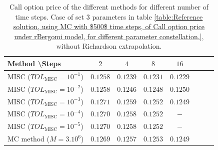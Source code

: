 \begin{table}[h!]
	\centering
	\begin{tabular}{l*{6}{c}r}
		Method \textbackslash  Steps            & $2$ & $4$ & $8$ & $16$ &   \\
		\hline
		MISC ($TOL_{\text{MISC}}=10^{-1}$)  & $0.1258$ & $0.1239$ & $0.1231$ & $0.1229$  \\
		MISC ($TOL_{\text{MISC}}=10^{-2}$)  & $0.1258$ & $0.1246$ & $0.1248$ & $0.1250$  \\
		
		MISC ($TOL_{\text{MISC}}=10^{-3}$)  & $0.1271$ & $0.1259$ & $0.1252$ & $0.1249$  \\
		MISC ($TOL_{\text{MISC}}=10^{-4}$)  & $0.1270$ & $0.1258$ & $0.1252$ & $-$  \\
		
			MISC ($TOL_{\text{MISC}}=10^{-5}$)  & $0.1270$ &$0.1258$ &  $0.1252$ & $-$  \\
		\hline
		MC method ($M=3.10^{6}$)   & $    0.1269$ & $0.1257$  & $0.1253$ & $0.1249$ \\		
		
		\hline
	\end{tabular}
	\caption{ Call option price of the different methods for different number of time steps. Case of set $3$ parameters in table \ref{table:Reference solution, using MC with $500$ time steps, of Call option price under rBergomi model, for different parameter constellation.}, without Richardson extrapolation.}
	\label{table: Call option price of the different methods for different number of time steps. Case set 3}
\end{table}


